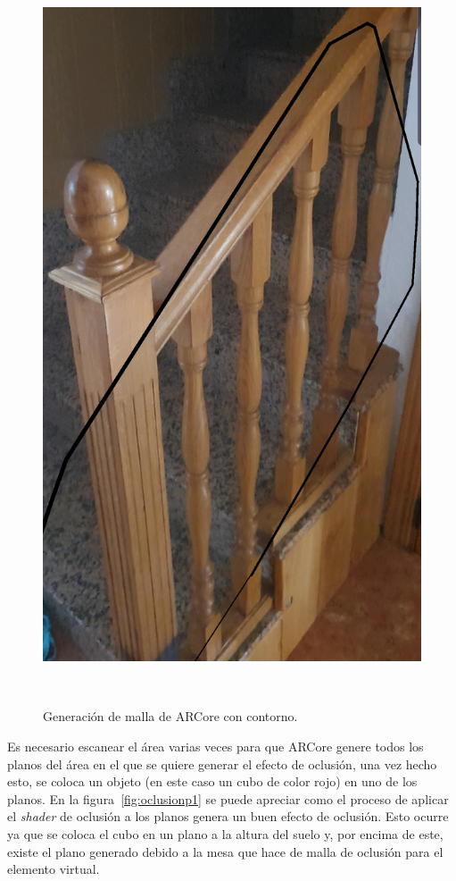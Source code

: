 \begin{figure}[H]
\begin{minipage}{0.5\textwidth}
        \includegraphics[scale=0.15]{Images/Shaders/oclusion (2).jpg}\\
    \end{minipage}\\
    \caption[Generación de malla de ARCore con contorno]{Generación de malla de ARCore con contorno.}
    \label{fig:mallaARCoreoclusion}
\end{figure}

Es necesario escanear el área varias veces para que ARCore genere todos los planos del área en el que se quiere generar el efecto de oclusión, una vez hecho esto, se coloca un objeto (en este caso un cubo de color rojo) en uno de los planos. En la figura~\ref{fig:oclusionp1} se puede apreciar como el proceso de aplicar el \textit{shader} de oclusión a los planos genera un buen efecto de oclusión. Esto ocurre ya que se coloca el cubo en un plano a la altura del suelo y, por encima de este, existe el plano generado debido a la mesa que hace de malla de oclusión para el elemento virtual. 

